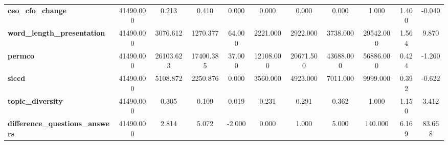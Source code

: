 \begin{table}
\begin{tabular}{lcccccccccc}
\textbf{ceo_cfo_change} & 41490.000 & 0.213 & 0.410 & 0.000 & 0.000 & 0.000 & 0.000 & 1.000 & 1.400 & -0.040 \\
\textbf{word_length_presentation} & 41490.000 & 3076.612 & 1270.377 & 64.000 & 2221.000 & 2922.000 & 3738.000 & 29542.000 & 1.564 & 9.870 \\
\textbf{permco} & 41490.000 & 26103.623 & 17400.385 & 37.000 & 12108.000 & 20671.500 & 43688.000 & 56886.000 & 0.424 & -1.260 \\
\textbf{siccd} & 41490.000 & 5108.872 & 2250.876 & 0.000 & 3560.000 & 4923.000 & 7011.000 & 9999.000 & 0.392 & -0.622 \\
\textbf{topic_diversity} & 41490.000 & 0.305 & 0.109 & 0.019 & 0.231 & 0.291 & 0.362 & 1.000 & 1.150 & 3.412 \\
\textbf{difference_questions_answers} & 41490.000 & 2.814 & 5.072 & -2.000 & 0.000 & 1.000 & 5.000 & 140.000 & 6.169 & 83.668 \\
\bottomrule
\end{tabular}
\end{table}
